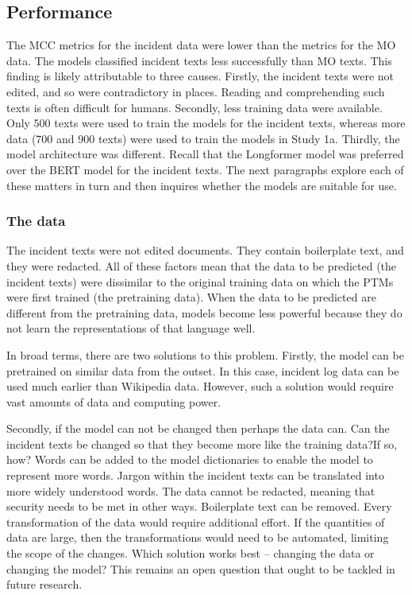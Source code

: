 \subsection{Performance} The MCC metrics for the incident data were lower than the metrics for the MO data. The models classified incident texts less successfully than MO texts. This finding is likely attributable to three causes. Firstly, the incident texts were not edited, and so were contradictory in places. Reading and comprehending such texts is often difficult for humans. Secondly, less training data were available. Only 500 texts were used to train the models for the incident texts, whereas more data (700 and 900 texts) were used to train the models in Study 1a. Thirdly, the model architecture was different. Recall that the Longformer model was preferred over the BERT model for the incident texts. The next paragraphs explore each of these matters in turn and then inquires whether the models are suitable for use.

\subsubsection{The data} The incident texts were not edited documents. They contain boilerplate text, and they were redacted. All of these factors mean that the data to be predicted (the incident texts) were dissimilar to the original training data on which the PTMs were first trained (the pretraining data). When the data to be predicted are different from the pretraining data, models become less powerful because they do not learn the representations of that language well. 

In broad terms, there are two solutions to this problem. Firstly, the model can be pretrained on similar data from the outset. In this case, incident log data can be used much earlier than Wikipedia data. However, such a solution would require vast amounts of data and computing power.

Secondly, if the model can not be changed then perhaps the data can. Can the incident texts be changed so that they become more like the training data?If so, how? Words can be added to the model dictionaries to enable the model to represent more words. Jargon within the incident texts can be translated into more widely understood words. The data cannot be redacted, meaning that security needs to be met in other ways. Boilerplate text can be removed. Every transformation of the data would require additional effort. If the quantities of data are large, then the transformations would need to be automated, limiting the scope of the changes. Which solution works best – changing the data or changing the model? This remains an open question that ought to be tackled in future research. 

